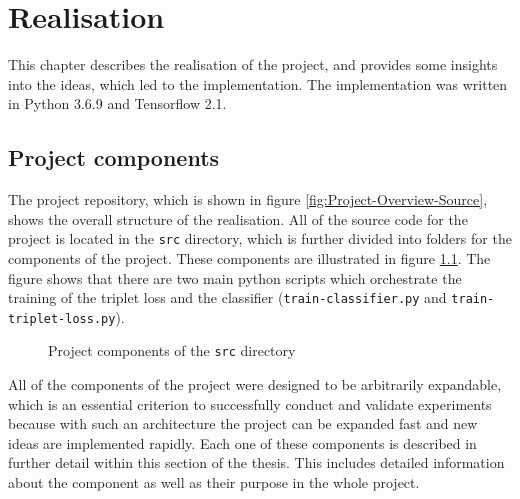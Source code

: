 \chapter{Realisation}
\label{ch:Realisation}
This chapter describes the realisation of the project, and provides some insights into the ideas, which led to the implementation. The implementation was written in Python 3.6.9 and Tensorflow 2.1.

\section{Project components}
\label{sec:Project-Components}
The project repository, which is shown in figure \ref{fig:Project-Overview-Source}, shows the overall structure of the realisation. All of the source code for the project is located in the \texttt{src} directory, which is further divided into folders for the components of the project. These components are illustrated in figure \ref{sec:Project-Components}. The figure shows that there are two main python scripts which orchestrate the training of the triplet loss and the classifier (\texttt{train-classifier.py} and \texttt{train-triplet-loss.py}). 

\begin{figure}[ht]
\caption{Project components of the \texttt{src} directory}
\label{fig:Project-Components}
\end{figure}
\noindent
All of the components of the project were designed to be arbitrarily expandable, which is an essential criterion to successfully conduct and validate experiments because with such an architecture the project can be expanded fast and new ideas are implemented rapidly.
\newline
\newline
Each one of these components is described in further detail within this section of the thesis. This includes detailed information about the component as well as their purpose in the whole project.

